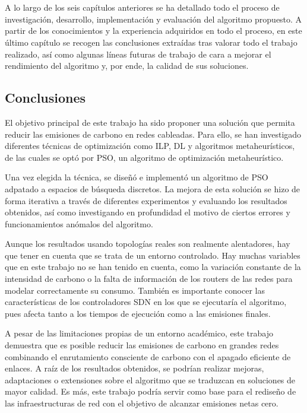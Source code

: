 \chapter{\conclusionsname} \label{chp:conclusiones}

A lo largo de los seis capítulos anteriores se ha detallado todo el proceso de investigación, desarrollo, implementación y evaluación del algoritmo propuesto. A partir de los conocimientos y la experiencia adquiridos en todo el proceso, en este último capítulo se recogen las conclusiones extraídas tras valorar todo el trabajo realizado, así como algunas líneas futuras de trabajo de cara a mejorar el rendimiento del algoritmo y, por ende, la calidad de sus soluciones.

\section{Conclusiones}

El objetivo principal de este trabajo ha sido proponer una solución que permita reducir las emisiones de carbono en redes cableadas. Para ello, se han investigado diferentes técnicas de optimización como ILP, DL y algoritmos metaheurísticos, de las cuales se optó por PSO, un algoritmo de optimización metaheurístico.

Una vez elegida la técnica, se diseñó e implementó un algoritmo de PSO adpatado a espacios de búsqueda discretos. La mejora de esta solución se hizo de forma iterativa a través de diferentes experimentos y evaluando los resultados obtenidos, así como investigando en profundidad el motivo de ciertos errores y funcionamientos anómalos del algoritmo.

Aunque los resultados usando topologías reales son realmente alentadores, hay que tener en cuenta que se trata de un entorno controlado. Hay muchas variables que en este trabajo no se han tenido en cuenta, como la variación constante de la intensidad de carbono o la falta de información de los routers de las redes para modelar correctamente su consumo. También es importante conocer las características de los controladores SDN en los que se ejecutaría el algoritmo, pues afecta tanto a los tiempos de ejecución como a las emisiones finales.

A pesar de las limitaciones propias de un entorno académico, este trabajo demuestra que es posible reducir las emisiones de carbono en grandes redes combinando el enrutamiento consciente de carbono con el apagado eficiente de enlaces. A raíz de los resultados obtenidos, se podrían realizar mejoras, adaptaciones o extensiones sobre el algoritmo que se traduzcan en soluciones de mayor calidad. Es más, este trabajo podría servir como base para el rediseño de las infraestructuras de red con el objetivo de alcanzar emisiones netas cero.

